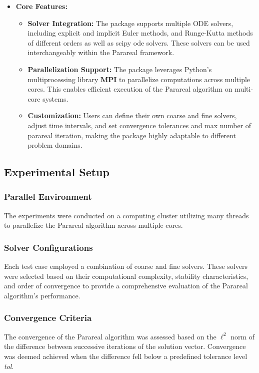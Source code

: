 \documentclass[a4paper,12pt,french]{article}
\begin{document}
\begin{itemize}
    \item \textbf{Core Features:} 
        \begin{itemize}
            \item \textbf{Solver Integration:} The package supports multiple ODE solvers, including explicit and implicit Euler methods, and Runge-Kutta methods of different orders as well as scipy ode solvers. These solvers can be used interchangeably within the Parareal framework.
            \item \textbf{Parallelization Support:} The package leverages Python's multiprocessing library \textbf{MPI} to parallelize computations across multiple cores. This enables efficient execution of the Parareal algorithm on multi-core systems.
            \item \textbf{Customization:} Users can define their own coarse and fine solvers, adjust time intervals, and set convergence tolerances and max number of parareal iteration, making the package highly adaptable to different problem domains.
        \end{itemize}
\end{itemize}

\subsection{Experimental Setup}
\subsubsection{Parallel Environment}
The experiments were conducted on a computing cluster utilizing many threads to parallelize the Parareal algorithm across multiple cores.

\subsubsection{Solver Configurations}
Each test case employed a combination of coarse and fine solvers. These solvers were selected based on their computational complexity, stability characteristics, and order of convergence to provide a comprehensive evaluation of the Parareal algorithm's performance.

\subsubsection{Convergence Criteria}
The convergence of the Parareal algorithm was assessed based on the $\boldsymbol\ell^2$ norm of the difference between successive iterations of the solution vector. Convergence was deemed achieved when the difference fell below a predefined tolerance level \textit{tol}.
\end{document}
